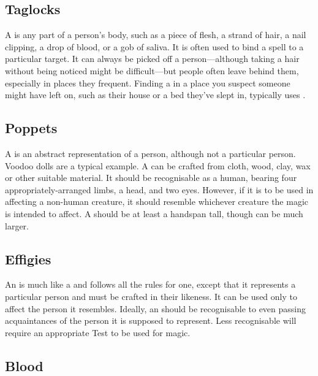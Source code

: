 \subsection{Taglocks}

A  is any part of a person's body, such as a piece of flesh, a strand of hair, a nail clipping, a drop of blood, or a gob of saliva.
It is often used to bind a spell to a particular target.
It can always be picked off a person---although taking a hair without being noticed might be difficult---but people often leave  behind them, especially in places they frequent.
Finding a  in a place you suspect someone might have left on, such as their house or a bed they've slept in, typically uses .

\subsection{Poppets}

A  is an abstract representation of a person, although not a particular person.
Voodoo dolls are a typical example.
A  can be crafted from cloth, wood, clay, wax or other suitable material.
It should be recognisable as a human, bearing four appropriately-arranged limbs, a head, and two eyes.
However, if it is to be used in  affecting a non-human creature, it should resemble whichever creature the magic is intended to affect.
A  should be at least a handspan tall, though can be much larger.

\subsection{Effigies}

An  is much like a  and follows all the rules for one, except that it represents a particular person and must be crafted in their likeness.
It can be used only to affect the person it resembles.
Ideally, an  should be recognisable to even passing acquaintances of the person it is supposed to represent.
Less recognisable  will require an appropriate Test to be used for magic.

\subsection{Blood}

